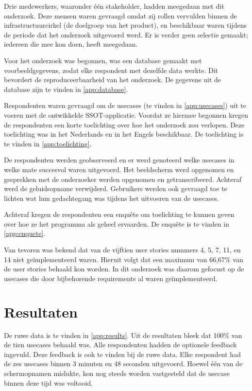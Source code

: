 \documentclass[a4paper, dutch]{article}
\begin{document}
Drie medewerkers, waaronder één stakeholder, hadden meegedaan met dit onderzoek. Deze mensen waren gevraagd omdat zij rollen vervulden binnen de infrastructuurcirkel (de doelgroep van het product), en beschikbaar waren tijdens de periode dat het onderzoek uitgevoerd werd. Er is verder geen selectie gemaakt; iedereen die mee kon doen, heeft meegedaan.

Voor het onderzoek was begonnen, was een database gemaakt met voorbeeldgegevens, zodat elke respondent met dezelfde data werkte. Dit bevordert de reproduceerbaarheid van het onderzoek. De gegevens uit de database zijn te vinden in \autoref{app:database}.

Respondenten waren gevraagd om de usecases (te vinden in \autoref{app:usecases}) uit te voeren met de ontwikkelde SSOT-applicatie. Voordat ze hiermee begonnen kregen de respondenten een korte toelichting over hoe het onderzoek zou verlopen. Deze toelichting was in het Nederlands en in het Engels beschikbaar. De toelichting is te vinden in \autoref{app:toelichting}.

De respondenten werden geobserveerd en er werd genoteerd welke usecases in welke mate succesvol waren uitgevoerd. Het beeldscherm werd opgenomen en gesprekken met de onderzoeker werden opgenomen en getranscribeerd. Achteraf werd de geluidsopname verwijderd. Gebruikers werden ook gevraagd toe te lichten wat hun gedachtegang was tijdens het uitvoeren van de usecases.

Achteraf kregen de respondenten een enquête om toelichting te kunnen geven over hoe ze het programma als geheel ervaarden. De enquête is te vinden in \autoref{app:enquete}.

Van tevoren was bekend dat van de vijftien user stories nummers 4, 5, 7, 11, en 14 niet geïmplementeerd waren. Hieruit volgt dat een maximum van 66,67\% van de user stories behaald kon worden. In dit onderzoek was daarom gefocust op de usecases die door bijbehorende requirements al waren geïmplementeerd.

\section{Resultaten}

De ruwe data is te vinden in \autoref{app:results}. Uit de resultaten bleek dat 100\% van de tien usecases behaald was. Alle respondenten hadden de optionele feedback ingevuld. Deze feedback is ook te vinden bij de ruwe data. Elke respondent had de zes usecases binnen 3 minuten en 48 seconden uitgevoerd. Hoewel één van de schermopnamen mislukte, kon nog steeds worden vastgesteld dat de usecase binnen deze tijd was voltooid.
\end{document}
